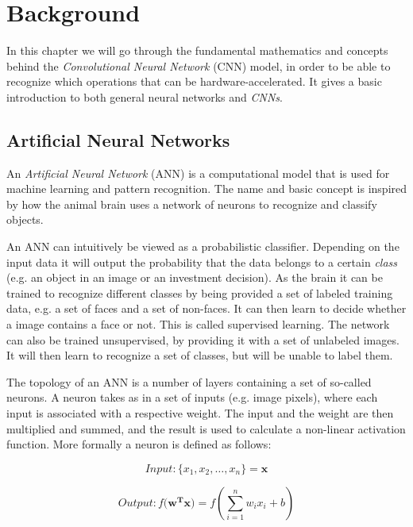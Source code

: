 \chapter{Background}

In this chapter we will go through the fundamental mathematics and concepts behind the \textit{Convolutional Neural Network} (CNN) model, in order to be able to recognize which operations that can be hardware-accelerated. It gives a basic introduction to both general neural networks and \textit{CNNs}.  

\section{Artificial Neural Networks}

An \textit{Artificial Neural Network} (ANN) is a computational model that is used for machine learning and pattern recognition. The name and basic concept is inspired by how the animal brain uses a network of neurons to recognize and classify objects. 

An ANN can intuitively be viewed as a probabilistic classifier. Depending on the input data it will output the probability that the data belongs to a certain \textit{class} (e.g. an object in an image or an investment decision). As the brain it can be trained to recognize different classes by being provided a set of labeled training data, e.g. a set of faces and a set of non-faces. It can then learn to decide whether a image contains a face or not. This is called supervised learning. The network can also be trained unsupervised, by providing it with a set of unlabeled images. It will then learn to recognize a set of classes, but will be unable to label them.  

The topology of an ANN is a number of layers containing a set of so-called neurons. A neuron takes as in a set of inputs (e.g. image pixels), where each input is associated with a respective weight. The input and the weight are then multiplied and summed, and the result is used to calculate a non-linear activation function. More formally a neuron is defined as follows: 

\begin{equation*}
Input: \{x_1, x_2,\dots, x_n\} = \mathbf{x} 
\end{equation*}

\begin{equation*}
Output: f(\mathbf{w^{T}x)} = f(\sum_{i=1}^{n}w_i x_i + b)
\end{equation*}

